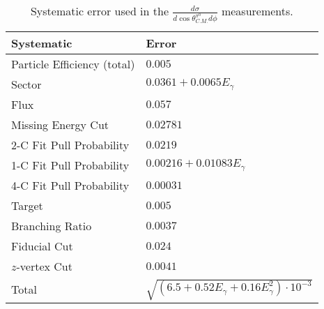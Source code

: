 \begin{table}[h!]
\begin{center}


\caption[Systematics]{\label{tab:systematics}Systematic error used in the $\frac{d\sigma}{d\cos\theta^{\pi^0}_{C.M.} d\phi}$ measurements.}

\begin{ruledtabular}
\begin{tabular}{l|l}
Systematic & Error \\
\hline
Particle Efficiency (total) & $0.005$ \\
Sector  & $ 0.0361 + 0.0065E_{\gamma}$ \\
Flux  & $ 0.057$ \\
Missing Energy Cut  & $0.02781$ \\
2-C Fit Pull Probability & $0.0219$ \\
1-C Fit Pull Probability  & $ 0.00216 + 0.01083E_{\gamma}$ \\
4-C Fit Pull Probability  & $0.00031$ \\ 
Target  & $0.005$ \\
Branching Ratio  & $0.0037$ \\
Fiducial Cut & $0.024$ \\
$z$-vertex Cut & $0.0041$ \\
Total & $\sqrt{(6.5 +0.52E_{\gamma} +0.16E_{\gamma}^2)\cdot10^{-3}}$ \\
\end{tabular}
\end{ruledtabular}

\end{center}
\end{table}
\vspace{20pt}